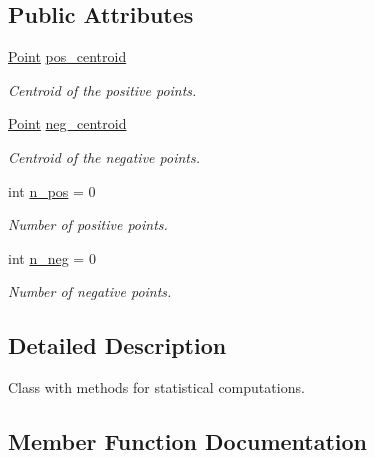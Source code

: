 \subsection*{Public Attributes}
\begin{DoxyCompactItemize}
\item 
\mbox{\label{class_statistics_a51adeaf4b7f078a4dfd373082fd1f7e1}} 
\hyperlink{class_point}{Point} \hyperlink{class_statistics_a51adeaf4b7f078a4dfd373082fd1f7e1}{pos\+\_\+centroid}
\begin{DoxyCompactList}\small\item\em Centroid of the positive points. \end{DoxyCompactList}\item 
\mbox{\label{class_statistics_ab7a104abc574d7d0e063f97ccc5f52e0}} 
\hyperlink{class_point}{Point} \hyperlink{class_statistics_ab7a104abc574d7d0e063f97ccc5f52e0}{neg\+\_\+centroid}
\begin{DoxyCompactList}\small\item\em Centroid of the negative points. \end{DoxyCompactList}\item 
\mbox{\label{class_statistics_a95918ee9568c41b665ba3920f3255829}} 
int \hyperlink{class_statistics_a95918ee9568c41b665ba3920f3255829}{n\+\_\+pos} = 0
\begin{DoxyCompactList}\small\item\em Number of positive points. \end{DoxyCompactList}\item 
\mbox{\label{class_statistics_a221eee7599d594bc55f69608c82bb242}} 
int \hyperlink{class_statistics_a221eee7599d594bc55f69608c82bb242}{n\+\_\+neg} = 0
\begin{DoxyCompactList}\small\item\em Number of negative points. \end{DoxyCompactList}\end{DoxyCompactItemize}


\subsection{Detailed Description}
Class with methods for statistical computations. 

\subsection{Member Function Documentation}
\mbox{\label{class_statistics_ab121520f7556f75e295e04ff71f2af39}} 
